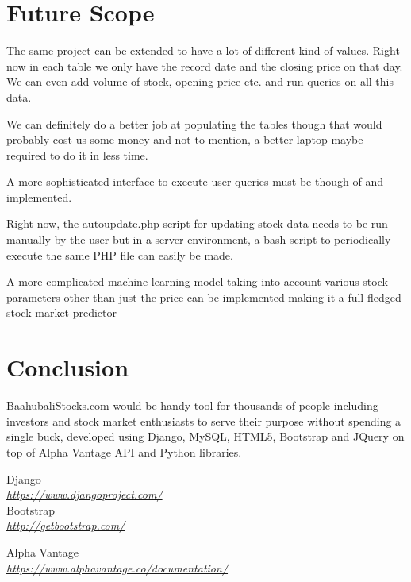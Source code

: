 \documentclass{report}
\begin{document}
\section{Future Scope}
The same project can be extended to have a lot of different kind of values. Right now in each table we only have the record date and the closing price on that day. We can even add volume of stock, opening price etc. and run queries on all this data. 

We can definitely do a better job at populating the tables though that would probably cost us some money and not to mention, a better laptop maybe required to do it in less time.

A more sophisticated interface to execute user queries must be though of and implemented. 

Right now, the autoupdate.php script for updating stock data needs to be run manually by the user but in a server environment, a bash script to periodically execute the same PHP file can easily be made.

A more complicated machine learning model taking into account various stock parameters other than just the price can be implemented making it a full fledged stock market predictor

\section{Conclusion}
BaahubaliStocks.com would be handy tool for thousands of people including investors and stock market enthusiasts to serve their purpose without spending a single buck, developed using Django, MySQL, HTML5, Bootstrap and JQuery on top of Alpha Vantage API and Python libraries. 



\begin{thebibliography}{00}
 Django \\
	\textit{\url{https://www.djangoproject.com/}} \\
	
 Bootstrap \\
	\textit{\url{http://getbootstrap.com/}}

 Alpha Vantage \\
	\textit{\url{https://www.alphavantage.co/documentation/}}
	

\end{thebibliography}
\end{document}
